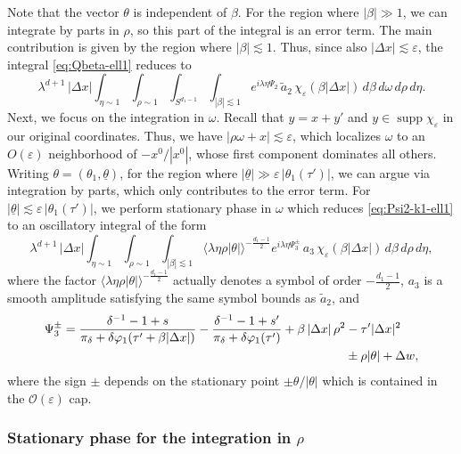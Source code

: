\documentclass[leqno]{amsart}
\theoremstyle{definition}
\theoremstyle{remark}
\numberwithin{equation}{section}
\DeclareMathOperator*{\supp}{supp}
\begin{document}
Note that the vector $\theta$ is independent of $\beta$. For the region where $|\beta|\gg 1$, we can integrate by parts in $\rho$, so this part of the integral is an error term. The main contribution is given by the region where $|\beta|\lesssim 1$. Thus, since also $|\Delta x|\lesssim \varepsilon$, the integral \eqref{eq:Qbeta-ell1} reduces to 
\begin{equation}\label{eq:Qbeta-ell1-main}
\lambda^{d+1}\,|\Delta x|
\int_{\eta\sim1}\int_{\rho\sim1}\int_{S^{d_1-1}}\int_{|\beta|\lesssim 1}
e^{i\lambda\eta \Psi_2 }\,
  \tilde a_2\,\chi_\varepsilon(\beta|\Delta x|)\,
d\beta\,d\omega\,d\rho\,d\eta.
\end{equation}
Next, we focus on the integration in $\omega$. Recall that $y=x+y'$ and $y\in \supp \chi_\varepsilon$ in our original coordinates. Thus, we have $|\rho\omega+x|\lesssim \varepsilon$, which localizes $\omega$ to an $O(\varepsilon)$ neighborhood of $-x^0/|x^0|$, whose first component dominates all others. Writing $\theta=(\theta_1,\underline \theta)$, for the region where $|\underline{\theta}|\gg \varepsilon\,|\theta_1(\tau')|$, we can argue via integration by parts, which only contributes to the error term. For $|\underline{\theta}|\lesssim \varepsilon\,|\theta_1(\tau')|$, we perform stationary phase in $\omega$ which reduces \eqref{eq:Psi2-k1-ell1} to an oscillatory integral of the form
\begin{equation}\label{eq:Qbeta-ell1-stat}
\lambda^{d+1}\,|\Delta x|
\int_{\eta\sim1}\int_{\rho\sim1}\int_{|\beta|\lesssim 1} \langle \lambda\eta\rho|\theta| \rangle^{-\frac{d_1-1}{2}}
e^{i\lambda\eta \Psi_3^{\pm}}\,
   a_3\, \chi_\varepsilon(\beta|\Delta x|)\,
d\beta\,d\rho\,d\eta,
\end{equation}
where the factor $\langle \lambda\eta\rho|\theta| \rangle^{-\frac{d_1-1}{2}}$ actually denotes a symbol of order $-\frac{d_1-1}{2}$, $a_3$ is a smooth amplitude satisfying the same symbol bounds as $\tilde a_2$, and
\begin{align}\label{eq:Psi3-k1-ell1}
\Psi_3^{\pm}
 = \frac{\delta^{-1}-1+s}{\pi_\delta+\delta\varphi_1(\tau'+\beta|\Delta x|)}
 -\frac{\delta^{-1}-1+s'}{\pi_\delta+\delta\varphi_1(\tau')} 
 +\beta\,|\Delta x|\,\rho^2
& - \tau' |\Delta x|^2 \\
& \pm \rho|\theta|
 + \Delta w, \notag
\end{align}
where the sign $\pm$ depends on the stationary point $\pm\theta/|\theta|$ which is contained in the $\mathcal O(\varepsilon)$ cap.


\subsubsection{Stationary phase for the integration in $\rho$}
\end{document}
